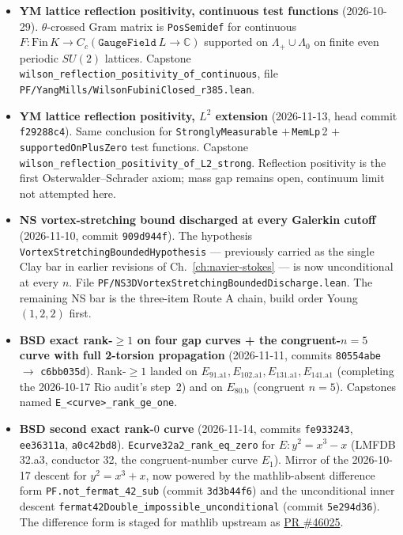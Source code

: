 \begin{itemize}
\item \textbf{YM lattice reflection positivity, continuous
test functions} (2026-10-29).
$\theta$-crossed Gram matrix is \texttt{PosSemidef} for continuous
$F : \mathrm{Fin}\,K \to C_c(\mathtt{GaugeField}\ L \to \mathbb{C})$
supported on $\Lambda_+ \cup \Lambda_0$ on finite even periodic
$SU(2)$ lattices.  Capstone
\texttt{wilson\_reflection\_positivity\_of\_continuous}, file
\texttt{PF/YangMills/WilsonFubiniClosed\_r385.lean}.

\item \textbf{YM lattice reflection positivity, $L^2$ extension}
(2026-11-13, head commit \texttt{f29288c4}).  Same conclusion for
\texttt{StronglyMeasurable} $+\,$\texttt{MemLp}\,2 $+\,$\texttt{supportedOnPlusZero} test functions.  Capstone
\texttt{wilson\_reflection\_positivity\_of\_L2\_strong}.  Reflection
positivity is the first Osterwalder--Schrader axiom; mass gap remains
open, continuum limit not attempted here.

\item \textbf{NS vortex-stretching bound discharged at every Galerkin
cutoff} (2026-11-10, commit \texttt{909d944f}).  The hypothesis
\texttt{VortexStretchingBoundedHypothesis} --- previously carried as
the single Clay bar in earlier revisions of Ch.~\ref{ch:navier-stokes}
--- is now unconditional at every $n$.  File
\texttt{PF/NS3DVortexStretchingBoundedDischarge.lean}.  The remaining
NS bar is the three-item Route A chain, build order Young
$(1, 2, 2)$ first.

\item \textbf{BSD exact rank-$\ge 1$ on four gap curves + the
congruent-$n = 5$ curve with full 2-torsion propagation}
(2026-11-11, commits \texttt{80554abe} $\to$ \texttt{c6bb035d}).
Rank-$\ge 1$ landed on $E_{91.\text{a}1}, E_{102.\text{a}1},
E_{131.\text{a}1}, E_{141.\text{a}1}$ (completing the 2026-10-17 Rio
audit's step~2) and on $E_{80.\text{b}}$ (congruent $n = 5$).
Capstones named \texttt{E\_<curve>\_rank\_ge\_one}.

\item \textbf{BSD second exact rank-$0$ curve}
(2026-11-14, commits \texttt{fe933243}, \texttt{ee36311a},
\texttt{a0c42bd8}).  \texttt{Ecurve32a2\_rank\_eq\_zero} for
$E : y^2 = x^3 - x$ (LMFDB 32.a3, conductor 32, the
congruent-number curve $E_1$).  Mirror of the 2026-10-17 descent for
$y^2 = x^3 + x$, now powered by the mathlib-absent difference form
\texttt{PF.not\_fermat\_42\_sub} (commit \texttt{3d3b44f6}) and the
unconditional inner descent
\texttt{fermat42Double\_impossible\_unconditional}
(commit \texttt{5e294d36}).  The difference form is staged for
mathlib upstream as
\href{https://github.com/leanprover-community/mathlib4/pull/46025}
{PR \#46025}.


\end{itemize}
